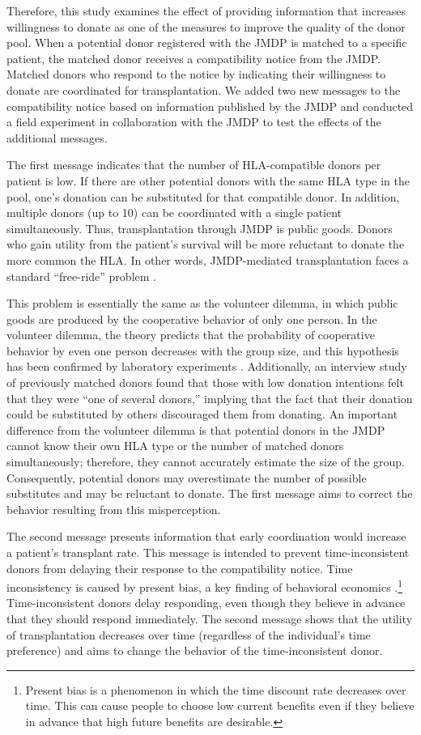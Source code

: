 \documentclass[
  11pt,
  a4paper
]{article}
\begin{document}
Therefore, this study examines the effect of providing information that increases willingness to donate as one of the measures to improve the quality of the donor pool. When a potential donor registered with the JMDP is matched to a specific patient, the matched donor receives a compatibility notice from the JMDP. Matched donors who respond to the notice by indicating their willingness to donate are coordinated for transplantation. We added two new messages to the compatibility notice based on information published by the JMDP and conducted a field experiment in collaboration with the JMDP to test the effects of the additional messages.

The first message indicates that the number of HLA-compatible donors per patient is low. If there are other potential donors with the same HLA type in the pool, one's donation can be substituted for that compatible donor. In addition, multiple donors (up to 10) can be coordinated with a single patient simultaneously. Thus, transplantation through JMDP is public goods. Donors who gain utility from the patient's survival will be more reluctant to donate the more common the HLA. In other words, JMDP-mediated transplantation faces a standard ``free-ride'' problem \citep{Bergstrom2009}.

This problem is essentially the same as the volunteer dilemma, in which public goods are produced by the cooperative behavior of only one person. In the volunteer dilemma, the theory predicts that the probability of cooperative behavior by even one person decreases with the group size, and this hypothesis has been confirmed by laboratory experiments \citep{Diekmann1985, Diekmann1986, Franzen1999, Davis2017}. Additionally, an interview study of previously matched donors \citep{Kurosawa2022} found that those with low donation intentions felt that they were ``one of several donors,'' implying that the fact that their donation could be substituted by others discouraged them from donating. An important difference from the volunteer dilemma is that potential donors in the JMDP cannot know their own HLA type or the number of matched donors simultaneously; therefore, they cannot accurately estimate the size of the group. Consequently, potential donors may overestimate the number of possible substitutes and may be reluctant to donate. The first message aims to correct the behavior resulting from this misperception.

The second message presents information that early coordination would increase a patient's transplant rate. This message is intended to prevent time-inconsistent donors from delaying their response to the compatibility notice. Time inconsistency is caused by present bias, a key finding of behavioral economics \citep{Laibson1997, ODonoghue2001}.\footnote{Present bias is a phenomenon in which the time discount rate decreases over time. This can cause people to choose low current benefits even if they believe in advance that high future benefits are desirable.} Time-inconsistent donors delay responding, even though they believe in advance that they should respond immediately. The second message shows that the utility of transplantation decreases over time (regardless of the individual's time preference) and aims to change the behavior of the time-inconsistent donor.
\end{document}
